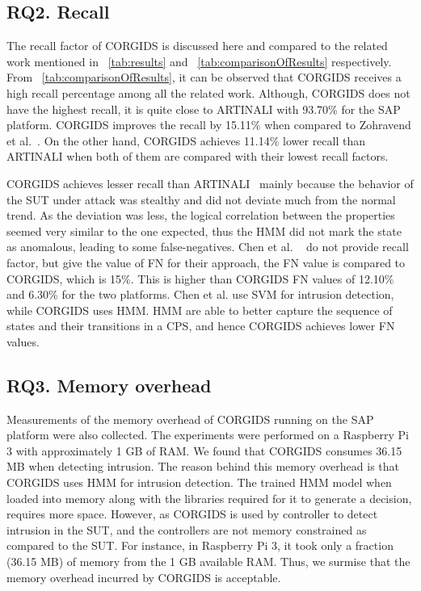 \subsection{RQ2. Recall}
The recall factor of \ac{CORGIDS} is discussed here and compared to the related work mentioned in ~\autoref{tab:results} and ~\autoref{tab:comparisonOfResults} respectively. From  ~\autoref{tab:comparisonOfResults}, it can be observed that \ac{CORGIDS} receives a high recall percentage among all the related work. Although, \ac{CORGIDS} does not have the highest recall, it is quite close to ARTINALI with 93.70\% for the \ac{SAP} platform. \ac{CORGIDS} improves the recall by 15.11\% when compared to  Zohravend et al.~\cite{zohrevand2016hidden}. On the other hand, \ac{CORGIDS} achieves 11.14\% lower recall than ARTINALI when both of them are compared with their lowest recall factors. 

 
\ac{CORGIDS} achieves lesser recall than ARTINALI~\cite{aliabadi2017artinali} mainly because the behavior of the \ac{SUT} under attack was stealthy and did not deviate much from the normal trend. As the deviation was less, the logical correlation between the properties seemed very similar to the one expected, thus the \ac{HMM} did not mark the state as anomalous, leading to some false-negatives. Chen et al. ~\cite{chen2018learning} do not provide recall factor, but give the value of \ac{FN} for their approach, the \ac{FN} value is compared to \ac{CORGIDS}, which is 15\%. This is higher than \ac{CORGIDS} \ac{FN} values of 12.10\% and 6.30\% for the two platforms. Chen et al. use \ac{SVM} for intrusion detection, while \ac{CORGIDS} uses \ac{HMM}. \ac{HMM} are able to better capture the sequence of states and their transitions in a \ac{CPS}, and hence \ac{CORGIDS} achieves lower \ac{FN} values.

\subsection{RQ3. Memory overhead}
Measurements of the memory overhead of \ac{CORGIDS} running on the \ac{SAP} platform were also collected. The experiments were performed on a Raspberry Pi 3 with approximately 1 GB of RAM. We found that \ac{CORGIDS} consumes 36.15 MB when detecting intrusion. The reason behind this memory overhead is that \ac{CORGIDS} uses \ac{HMM} for intrusion detection. The trained \ac{HMM} model when loaded into memory along with the libraries required for it to generate a decision, requires more space. However, as \ac{CORGIDS} is used by controller to detect intrusion in the \ac{SUT}, and the controllers are not memory constrained as compared to the \ac{SUT}. For instance, in Raspberry Pi 3, it took only a fraction (36.15 MB) of memory from the 1 GB available RAM. Thus, we surmise that the memory overhead incurred by \ac{CORGIDS} is acceptable.

